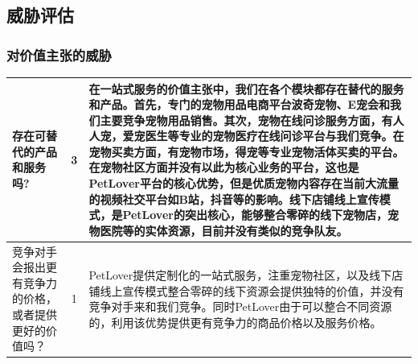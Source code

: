 \documentclass[a4paper]{ctexart}
\begin{document}
\FloatBarrier
\subsection{威胁评估}
\subsubsection{对价值主张的威胁}
\begin{table}[h]
  \centering
\begin{tabular}{|p{3.5cm}|c|p{10cm}|}
  \hline
  存在可替代的产品和服务吗? & 3 & 在一站式服务的价值主张中，我们在各个模块都存在替代的服务和产品。首先，专门的宠物用品电商平台波奇宠物、E宠会和我们主要竞争宠物用品销售。其次，宠物在线问诊服务方面，有人人宠，爱宠医生等专业的宠物医疗在线问诊平台与我们竞争。在宠物买卖方面，有宠物市场，得宠等专业宠物活体买卖的平台。在宠物社区方面并没有以此为核心业务的平台，这也是PetLover平台的核心优势，但是优质宠物内容存在当前大流量的视频社交平台如B站，抖音等的影响。线下店铺线上宣传模式，是PetLover的突出核心，能够整合零碎的线下宠物店，宠物医院等的实体资源，目前并没有类似的竞争队友。\\
  \hline
  竞争对手会报出更有竞争力的价格，或者提供更好的价值吗？ & 1 & PetLover提供定制化的一站式服务，注重宠物社区，以及线下店铺线上宣传模式整合零碎的线下资源会提供独特的价值，并没有竞争对手来和我们竞争。同时PetLover由于可以整合不同资源的，利用该优势提供更有竞争力的商品价格以及服务价格。\\
  \hline
\end{tabular}
\end{table}

\FloatBarrier
\end{document}
